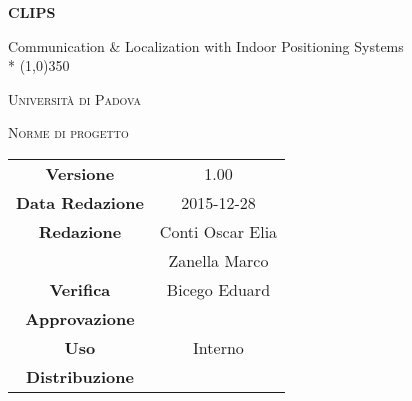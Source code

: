\documentclass[a4paper,12pt]{article}
\author{Conti Oscar Elia, Zanella Marco}
\date{24/12/2015}
\begin{document}
\begin{titlepage}
	\centering
	{\huge\bfseries CLIPS\par}
	Communication \& Localization with Indoor Positioning Systems \\*
	\line(1,0){350} \\
	{\scshape\LARGE Università di Padova \par}
	\vspace{1cm}
	{\scshape\Large Norme di progetto \par}
	\logo
	\newpage
		\begin{tabular}{c|c}
			{\hfill \textbf{Versione}} 			& 1.00			\\
			{\hfill\textbf{Data Redazione}} 		& 2015-12-28  		\\ 
			{\hfill\textbf{Redazione}} 			&  Conti Oscar Elia \\ 
											&  Zanella Marco       \\
			{\hfill\textbf{Verifica}} 				&  Bicego Eduard   \\
			{\hfill\textbf{Approvazione}} 		&  \\
			{\hfill\textbf{Uso}} 					& Interno			\\
			{\hfill\textbf{Distribuzione}} 			& \leaf			\\
		\end{tabular}
	\end{titlepage}
	\newpage
	
	\pagestyle{myfront}
	\newpage
	\tableofcontents	
	\label{LastFrontPage}
	\newpage
	\pagestyle{mymain}
         
         	\newpage
		

	\newpage
		
	
	\newpage
		
	
	\newpage
		
		
	\label{LastPage}
\end{document}
